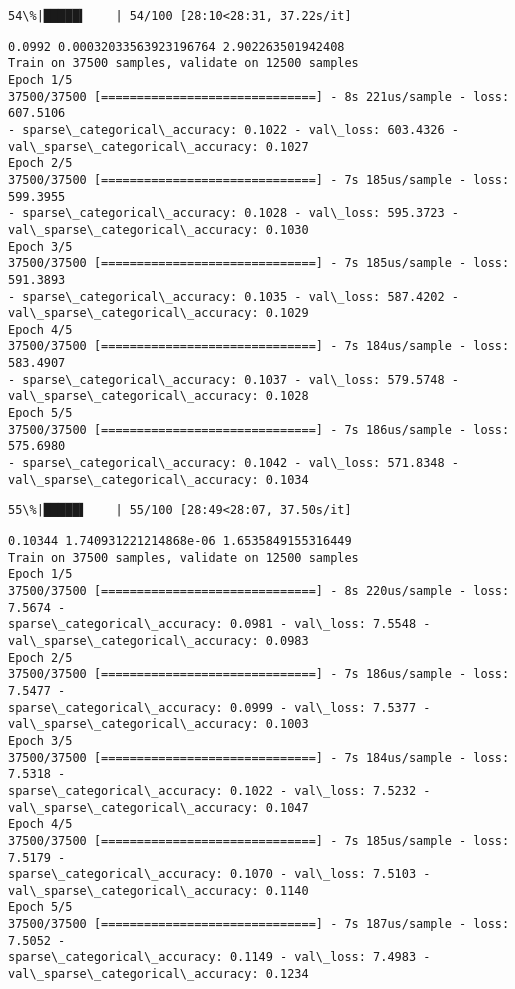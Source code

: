 \documentclass[11pt]{article}
\begin{document}
    \begin{Verbatim}[commandchars=\\\{\}]
 54\%|█████▍    | 54/100 [28:10<28:31, 37.22s/it]
    \end{Verbatim}

    \begin{Verbatim}[commandchars=\\\{\}]
0.0992 0.00032033563923196764 2.902263501942408
Train on 37500 samples, validate on 12500 samples
Epoch 1/5
37500/37500 [==============================] - 8s 221us/sample - loss: 607.5106
- sparse\_categorical\_accuracy: 0.1022 - val\_loss: 603.4326 -
val\_sparse\_categorical\_accuracy: 0.1027
Epoch 2/5
37500/37500 [==============================] - 7s 185us/sample - loss: 599.3955
- sparse\_categorical\_accuracy: 0.1028 - val\_loss: 595.3723 -
val\_sparse\_categorical\_accuracy: 0.1030
Epoch 3/5
37500/37500 [==============================] - 7s 185us/sample - loss: 591.3893
- sparse\_categorical\_accuracy: 0.1035 - val\_loss: 587.4202 -
val\_sparse\_categorical\_accuracy: 0.1029
Epoch 4/5
37500/37500 [==============================] - 7s 184us/sample - loss: 583.4907
- sparse\_categorical\_accuracy: 0.1037 - val\_loss: 579.5748 -
val\_sparse\_categorical\_accuracy: 0.1028
Epoch 5/5
37500/37500 [==============================] - 7s 186us/sample - loss: 575.6980
- sparse\_categorical\_accuracy: 0.1042 - val\_loss: 571.8348 -
val\_sparse\_categorical\_accuracy: 0.1034
    \end{Verbatim}

    \begin{Verbatim}[commandchars=\\\{\}]
 55\%|█████▌    | 55/100 [28:49<28:07, 37.50s/it]
    \end{Verbatim}

    \begin{Verbatim}[commandchars=\\\{\}]
0.10344 1.740931221214868e-06 1.6535849155316449
Train on 37500 samples, validate on 12500 samples
Epoch 1/5
37500/37500 [==============================] - 8s 220us/sample - loss: 7.5674 -
sparse\_categorical\_accuracy: 0.0981 - val\_loss: 7.5548 -
val\_sparse\_categorical\_accuracy: 0.0983
Epoch 2/5
37500/37500 [==============================] - 7s 186us/sample - loss: 7.5477 -
sparse\_categorical\_accuracy: 0.0999 - val\_loss: 7.5377 -
val\_sparse\_categorical\_accuracy: 0.1003
Epoch 3/5
37500/37500 [==============================] - 7s 184us/sample - loss: 7.5318 -
sparse\_categorical\_accuracy: 0.1022 - val\_loss: 7.5232 -
val\_sparse\_categorical\_accuracy: 0.1047
Epoch 4/5
37500/37500 [==============================] - 7s 185us/sample - loss: 7.5179 -
sparse\_categorical\_accuracy: 0.1070 - val\_loss: 7.5103 -
val\_sparse\_categorical\_accuracy: 0.1140
Epoch 5/5
37500/37500 [==============================] - 7s 187us/sample - loss: 7.5052 -
sparse\_categorical\_accuracy: 0.1149 - val\_loss: 7.4983 -
val\_sparse\_categorical\_accuracy: 0.1234
    \end{Verbatim}
\end{document}

